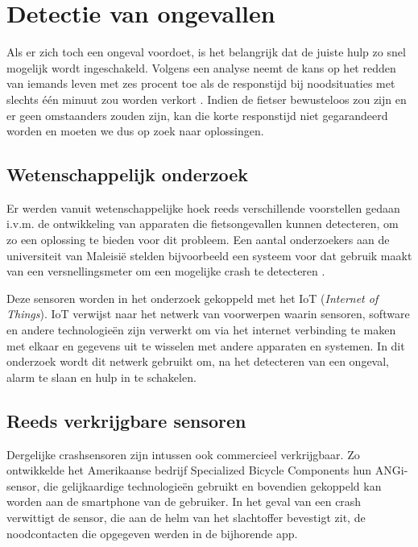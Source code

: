 \documentclass[kulak]{kulakarticle} %
\begin{document}
\section{Detectie van ongevallen}

Als er zich toch een ongeval voordoet, is het belangrijk dat de juiste hulp zo snel mogelijk wordt ingeschakeld. Volgens een analyse neemt de kans op het redden van iemands leven met zes procent toe als de responstijd bij noodsituaties met slechts één minuut zou worden verkort \cite{KhanArsalan2018Adas}. Indien de fietser bewusteloos zou zijn en er geen omstaanders zouden zijn, kan die korte responstijd niet gegarandeerd worden en moeten we dus op zoek naar oplossingen.

\subsection{Wetenschappelijk onderzoek}

Er werden vanuit wetenschappelijke hoek reeds verschillende voorstellen gedaan i.v.m. de ontwikkeling van apparaten die fietsongevallen kunnen detecteren, om zo een oplossing te bieden voor dit probleem. Een aantal onderzoekers aan de universiteit van Maleisië stelden bijvoorbeeld een systeem voor dat gebruik maakt van een versnellingsmeter om een mogelijke crash te detecteren \cite{KitTamJun2023CFDS}. 

Deze sensoren worden in het onderzoek gekoppeld met het IoT (\textit{Internet of Things}). IoT verwijst naar het netwerk van voorwerpen waarin sensoren, software en andere technologieën zijn verwerkt om via het internet verbinding te maken met elkaar en gegevens uit te wisselen met andere apparaten en systemen. In dit onderzoek wordt dit netwerk gebruikt om, na het detecteren van een ongeval, alarm te slaan en hulp in te schakelen.

\subsection{Reeds verkrijgbare sensoren}

Dergelijke crashsensoren zijn intussen ook commercieel verkrijgbaar. Zo ontwikkelde het Amerikaanse bedrijf Specialized Bicycle Components hun ANGi-sensor, die gelijkaardige technologieën gebruikt en bovendien gekoppeld kan worden aan de smartphone van de gebruiker. In het geval van een crash verwittigt de sensor, die aan de helm van het slachtoffer bevestigt zit, de noodcontacten die opgegeven werden in de bijhorende app.
\end{document}

